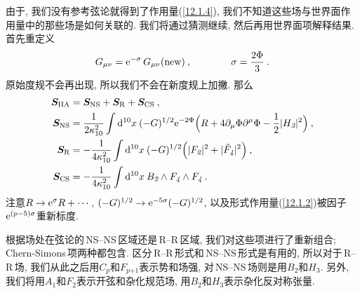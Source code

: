 由于, 我们没有参考弦论就得到了作用量(\ref{12.1.4}), 我们不知道这些场与世界面作用量中的那些场是如何关联的. 我们将通过猜测继续, 然后再用世界面项解释结果. 首先重定义
\begin{equation}
    G_{\mu\nu}=\mathrm{e}^{-\sigma}\,G_{\mu\nu}(\text{new})\:, \qquad \qquad \sigma=\frac{2\Phi}{3}\:.\label{12.1.9}
\end{equation}
原始度规不会再出现, 所以我们不会在新度规上加撇. 那么
\begin{subequations}
    \begin{align}
        \bm{S}_{\text{IIA}} &= \bm{S}_{\text{NS}}+ \bm{S}_{\text{R}}+\bm{S}_{\text{CS}} \:, \label{12.1.10a} \\
        \bm{S}_{\text{NS}} &= \frac{1}{2\kappa_{10}^{2}}\int \mathrm{d}^{10}x\:(-G)^{1/2}\mathrm{e}^{-2\Phi}\Bigl(R+4\partial_{\mu}\Phi\partial^{\mu}\Phi-\frac{1}{2}\lvert H_{\textit{3}}\rvert^{2} \Bigr) \:,  \label{12.1.10b} \\
        \bm{S}_{\text{R}}&=-\frac{1}{4\kappa_{10}^{2}}\int\mathrm{d}^{10}x\:(-G)^{1/2}\Bigl(\lvert F_{\textit{2}}\rvert^{2}+\lvert \tilde{F}_{\textit{4}}\rvert^{2}\Bigr) \:, \label{12.1.10c}\\
        \bm{S}_{\text{CS}}&=-\frac{1}{4\kappa_{10}^{2}}\int\mathrm{d}^{10}x\:B_{\textit{2}}\wedge
        F_{\textit{4}}\wedge F_{\textit{4}} \:. \label{12.1.10d}
    \end{align} \label{12.1.10}
\end{subequations}
注意$ R\to \mathrm{e}^{\sigma}R+\cdots$, $(-G)^{1/2}\to \mathrm{e}^{-5\sigma}(-G)^{1/2}$, 以及形式作用量(\ref{12.1.2})被因子$  \mathrm{e}^{(p-5)\sigma} $重新标度.

根据场处在弦论的\,NS--NS\,区域还是\,R--R\,区域, 我们对这些项进行了重新组合; Chern-Simons\,项两种都包含. 区分\,R--R\,形式和\,NS--NS\,形式是有用的, 所以对于\,R--R\,场, 我们从此之后用$ C_{\textit{p}} $和$ F_{\textit{p+1}} $表示势和场强, 对\,NS--NS\,场则是用$ B_{\textit{2}} $和$ H_{\textit{3}}$. 另外, 我们将用$ A_{\textit{1}} $和$ F_{\textit{2}} $表示开弦和杂化规范场, 用$ B_{\textit{2}} $和$ H_{\textit{3}} $表示杂化反对称张量.

